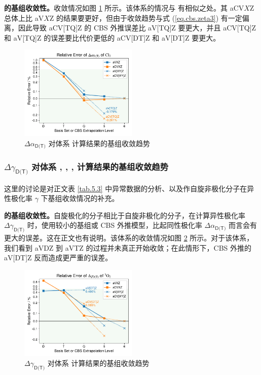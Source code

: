 \textbf{ 的基组收敛性。}收敛情况如图 \ref{fig.Cl2-iso} 所示。该体系的情况与  有相似之处。其 aCV$X$Z 总体上比 aV$X$Z 的结果要更好，但由于收敛趋势与式 (\ref{eq.cbs.zeta3}) 有一定偏离，因此导致 aCV[TQ]Z 的 CBS 外推误差比 aV[TQ]Z 要更大，并且 aCV[TQ]Z 和 aV[TQ]Z 的误差要比代价更低的 aCV[DT]Z 和 aV[DT]Z 要更大。

\begin{figure}[ht]
    \centering
    \caption{$\Delta \alpha_\textsf{D(T)}$ 对体系  计算结果的基组收敛趋势}
    \label{fig.Cl2-iso}
    \includegraphics[width=0.5\textwidth]{assets/Cl2-iso.pdf}
\end{figure}

\subsubsection{$\Delta \gamma_\textsf{D(T)}$ 对体系 , , ,  计算结果的基组收敛趋势}
\label{sec.5.s5}

这里的讨论是对正文表 \ref{tab.5.3} 中异常数据的分析、以及作自旋非极化分子在异性极化率 $\gamma$ 下基组收敛情况的补充。

\textbf{ 的基组收敛性。}自旋极化的分子相比于自旋非极化的分子，在计算异性极化率 $\Delta \gamma_\textsf{D(T)}$ 时，使用较小的基组或 CBS 外推模型，比起同性极化率 $\Delta \alpha_\textsf{D(T)}$ 而言会有更大的误差。这在正文也有说明。该体系的收敛情况如图 \ref{fig.O2-aniso} 所示。对于该体系，我们看到 aVDZ 到 aVTZ 的过程并未真正开始收敛；在此情形下，CBS 外推的 aV[DT]Z 反而造成更严重的误差。

\begin{figure}[ht]
    \centering
    \caption{$\Delta \gamma_\textsf{D(T)}$ 对体系  计算结果的基组收敛趋势}
    \label{fig.O2-aniso}
    \includegraphics[width=0.5\textwidth]{assets/O2-aniso.pdf}
\end{figure}

